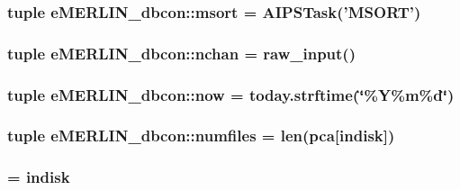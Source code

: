 \hypertarget{namespacee_m_e_r_l_i_n__dbcon_a0b851c2b085a1289afca9f960d54d4c6}{
\subsubsection[{msort}]{\setlength{\rightskip}{0pt plus 5cm}tuple {\bf e\-M\-E\-R\-L\-I\-N\-\_\-dbcon\-::msort} = \-A\-I\-P\-S\-Task('\-M\-S\-O\-R\-T')}}\label{namespacee_m_e_r_l_i_n__dbcon_a0b851c2b085a1289afca9f960d54d4c6}
\hypertarget{namespacee_m_e_r_l_i_n__dbcon_ac41ff8a94095c2e305fed016874bb042}{
\subsubsection[{nchan}]{\setlength{\rightskip}{0pt plus 5cm}tuple {\bf e\-M\-E\-R\-L\-I\-N\-\_\-dbcon\-::nchan} = raw\-\_\-input()}}\label{namespacee_m_e_r_l_i_n__dbcon_ac41ff8a94095c2e305fed016874bb042}
\hypertarget{namespacee_m_e_r_l_i_n__dbcon_aab95cae7a70890c472b8b8feb7d11ceb}{
\subsubsection[{now}]{\setlength{\rightskip}{0pt plus 5cm}tuple {\bf e\-M\-E\-R\-L\-I\-N\-\_\-dbcon\-::now} = today.\-strftime(\char`\"{}\%\-Y\%m\%d\char`\"{})}}\label{namespacee_m_e_r_l_i_n__dbcon_aab95cae7a70890c472b8b8feb7d11ceb}
\hypertarget{namespacee_m_e_r_l_i_n__dbcon_a5d477fadbfaebfae4c30eb008c302f01}{
\subsubsection[{numfiles}]{\setlength{\rightskip}{0pt plus 5cm}tuple {\bf e\-M\-E\-R\-L\-I\-N\-\_\-dbcon\-::numfiles} = len({\bf pca}\mbox{[}{\bf indisk}\mbox{]})}}\label{namespacee_m_e_r_l_i_n__dbcon_a5d477fadbfaebfae4c30eb008c302f01}
\hypertarget{namespacee_m_e_r_l_i_n__dbcon_a10a2e5d653a36bede24e60c74e4ed0a3}{
\subsubsection[{outdisk}]{ = {\bf indisk}}}\label{namespacee_m_e_r_l_i_n__dbcon_a10a2e5d653a36bede24e60c74e4ed0a3}
